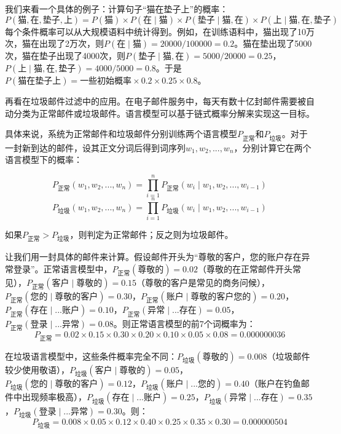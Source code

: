 我们来看一个具体的例子：计算句子“猫在垫子上”的概率：
\[
P(\text{猫}, \text{在}, \text{垫子}, \text{上}) = P(\text{猫}) \times P(\text{在} \mid \text{猫}) \times P(\text{垫子} \mid \text{猫}, \text{在}) \times P(\text{上} \mid \text{猫}, \text{在}, \text{垫子})
\]
每个条件概率可以从大规模语料中统计得到。例如，在训练语料中，猫出现了10万次，猫在出现了2万次，则$P(\text{在} \mid \text{猫}) = 20000/100000 = 0.2$。猫在垫出现了5000次，猫在垫子出现了4000次，则$P(\text{垫子} \mid \text{猫}, \text{在}) = 5000/20000 = 0.25$，$P(\text{上} \mid \text{猫}, \text{在}, \text{垫子}) = 4000/5000 = 0.8$。于是$P(\text{猫在垫子上}) = \text{一些初始概率} \times 0.2 \times 0.25 \times 0.8$。

再看在垃圾邮件过滤中的应用。在电子邮件服务中，每天有数十亿封邮件需要被自动分类为正常邮件或垃圾邮件。语言模型可以基于链式概率分解来实现这一目标。

具体来说，系统为正常邮件和垃圾邮件分别训练两个语言模型$P_{\text{正常}}$和$P_{\text{垃圾}}$。对于一封新到达的邮件，设其正文分词后得到词序列$w_1, w_2, ..., w_n$，分别计算它在两个语言模型下的概率：

\[
P_{\text{正常}}(w_1, w_2, ..., w_n) = \prod_{i=1}^{n} P_{\text{正常}}(w_i \mid w_1, w_2, ..., w_{i-1})
\]
\[
P_{\text{垃圾}}(w_1, w_2, ..., w_n) = \prod_{i=1}^{n} P_{\text{垃圾}}(w_i \mid w_1, w_2, ..., w_{i-1})
\]

如果$P_{\text{正常}} > P_{\text{垃圾}}$，则判定为正常邮件；反之则为垃圾邮件。

让我们用一封具体的邮件来计算。假设邮件开头为“尊敬的客户，您的账户存在异常登录”。正常语言模型中，$P_{\text{正常}}(\text{尊敬的}) = 0.02$（尊敬的在正常邮件开头常见），$P_{\text{正常}}(\text{客户} \mid \text{尊敬的}) = 0.15$（尊敬的客户是常见的商务问候），$P_{\text{正常}}(\text{您的} \mid \text{尊敬的客户}) = 0.30$，$P_{\text{正常}}(\text{账户} \mid \text{尊敬的客户您的}) = 0.20$，$P_{\text{正常}}(\text{存在} \mid \text{...账户}) = 0.10$，$P_{\text{正常}}(\text{异常} \mid \text{...存在}) = 0.05$，$P_{\text{正常}}(\text{登录} \mid \text{...异常}) = 0.08$。则正常语言模型的前7个词概率为：
\[
P_{\text{正常}} = 0.02 \times 0.15 \times 0.30 \times 0.20 \times 0.10 \times 0.05 \times 0.08 = 0.000000036
\]

在垃圾语言模型中，这些条件概率完全不同：$P_{\text{垃圾}}(\text{尊敬的}) = 0.008$（垃圾邮件较少使用敬语），$P_{\text{垃圾}}(\text{客户} \mid \text{尊敬的}) = 0.05$，$P_{\text{垃圾}}(\text{您的} \mid \text{尊敬的客户}) = 0.12$，$P_{\text{垃圾}}(\text{账户} \mid \text{...您的}) = 0.40$（账户在钓鱼邮件中出现频率极高），$P_{\text{垃圾}}(\text{存在} \mid \text{...账户}) = 0.25$，$P_{\text{垃圾}}(\text{异常} \mid \text{...存在}) = 0.35$，$P_{\text{垃圾}}(\text{登录} \mid \text{...异常}) = 0.30$。则：
\[
P_{\text{垃圾}} = 0.008 \times 0.05 \times 0.12 \times 0.40 \times 0.25 \times 0.35 \times 0.30 = 0.000000504
\]

